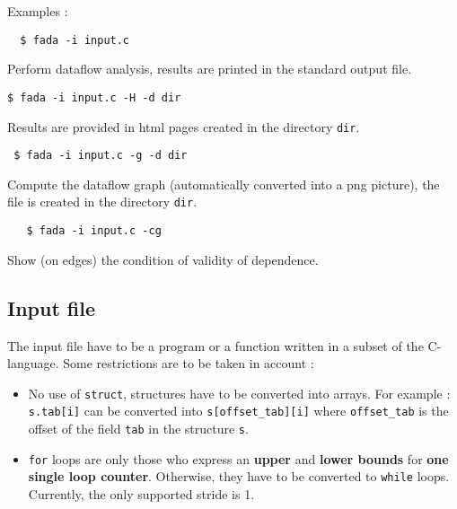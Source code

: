Examples :
\begin{verbatim}
  $ fada -i input.c 
\end{verbatim}
Perform dataflow analysis, results are printed in the standard output file.\\
\begin{verbatim}
$ fada -i input.c -H -d dir 
\end{verbatim}
Results are provided in html pages created in the directory \verb|dir|.\\

\begin{verbatim}
 $ fada -i input.c -g -d dir
\end{verbatim}
Compute the dataflow graph (automatically converted into a png picture), the file is created in the directory \verb|dir|.\\
\begin{verbatim}
   $ fada -i input.c -cg
\end{verbatim}
Show (on edges) the condition of validity of dependence.\\


\subsection{Input file}

The input file have to be a program or a function written in a subset of the C-language. Some restrictions are to be taken in account :
\begin{itemize}
 \item No use of \verb|struct|, structures have to be converted into arrays. For example : \verb|s.tab[i]| can be converted into \verb|s[offset_tab][i]| where \verb|offset_tab| is the offset of the field \verb|tab| in the structure \verb|s|.
 \item \verb|for| loops are only those who express an \textbf{upper} and \textbf{lower bounds} for\textbf{ one single loop counter}. Otherwise, they have to be converted to \verb|while| loops. Currently, the only supported stride is 1.
\end{itemize}
